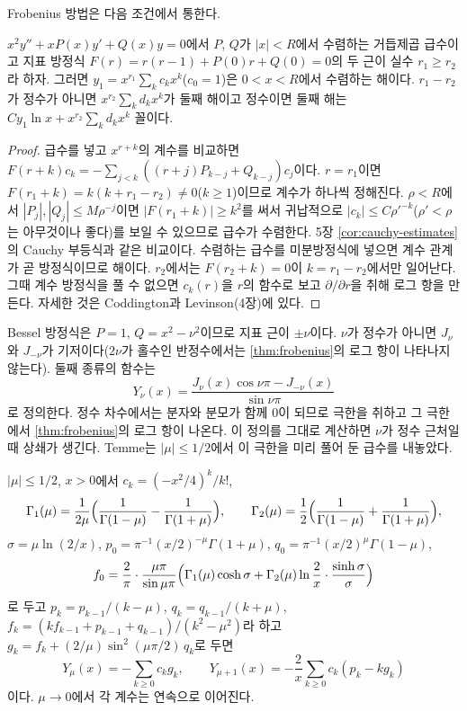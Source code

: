 Frobenius 방법은 다음 조건에서 통한다.

\begin{theorem}[Frobenius]
\label{thm:frobenius}
$x^2y''+xP(x)y'+Q(x)y=0$에서 $P$, $Q$가 $|x|<R$에서 수렴하는 거듭제곱 급수이고 지표 방정식 $F(r)=r(r-1)+P(0)r+Q(0)=0$의 두 근이 실수 $r_1\ge r_2$라 하자. 그러면 $y_1=x^{r_1}\sum_kc_kx^k$($c_0=1$)은 $0<x<R$에서 수렴하는 해이다. $r_1-r_2$가 정수가 아니면 $x^{r_2}\sum_kd_kx^k$가 둘째 해이고 정수이면 둘째 해는 $Cy_1\ln x+x^{r_2}\sum_kd_kx^k$ 꼴이다.
\end{theorem}

\begin{proof}
급수를 넣고 $x^{r+k}$의 계수를 비교하면 $F(r+k)c_k=-\sum_{j<k}((r+j)P_{k-j}+Q_{k-j})c_j$이다. $r=r_1$이면 $F(r_1+k)=k(k+r_1-r_2)\ne0$($k\ge1$)이므로 계수가 하나씩 정해진다. $\rho<R$에서 $|P_j|,|Q_j|\le M\rho^{-j}$이면 $|F(r_1+k)|\ge k^2$를 써서 귀납적으로 $|c_k|\le C\rho'^{-k}$($\rho'<\rho$는 아무것이나 좋다)를 보일 수 있으므로 급수가 수렴한다. 5장 \cref{cor:cauchy-estimates}의 Cauchy 부등식과 같은 비교이다. 수렴하는 급수를 미분방정식에 넣으면 계수 관계가 곧 방정식이므로 해이다. $r_2$에서는 $F(r_2+k)=0$이 $k=r_1-r_2$에서만 일어난다. 그때 계수 방정식을 풀 수 없으면 $c_k(r)$을 $r$의 함수로 보고 $\partial/\partial r$을 취해 로그 항을 만든다. 자세한 것은 Coddington과 Levinson\cite{coddington1955}(4장)에 있다.
\end{proof}

Bessel 방정식은 $P=1$, $Q=x^2-\nu^2$이므로 지표 근이 $\pm\nu$이다. $\nu$가 정수가 아니면 $J_\nu$와 $J_{-\nu}$가 기저이다($2\nu$가 홀수인 반정수에서는 \cref{thm:frobenius}의 로그 항이 나타나지 않는다). 둘째 종류의 함수는
\begin{equation}
\label{eq:yv-def}
Y_\nu(x)=\frac{J_\nu(x)\cos\nu\pi-J_{-\nu}(x)}{\sin\nu\pi}
\end{equation}
로 정의한다. 정수 차수에서는 분자와 분모가 함께 $0$이 되므로 극한을 취하고 그 극한에서 \cref{thm:frobenius}의 로그 항이 나온다. 이 정의를 그대로 계산하면 $\nu$가 정수 근처일 때 상쇄가 생긴다. Temme\cite{temme1975bessel}는 $|\mu|\le1/2$에서 이 극한을 미리 풀어 둔 급수를 내놓았다.

\begin{proposition}[Temme의 급수]
\label{prop:temme-series}
$|\mu|\le1/2$, $x>0$에서 $c_k=(-x^2/4)^k/k!$,
\[
\Gamma_1(\mu)=\frac{1}{2\mu}\Bigl(\frac{1}{\Gamma(1-\mu)}-\frac{1}{\Gamma(1+\mu)}\Bigr),\qquad\Gamma_2(\mu)=\frac12\Bigl(\frac{1}{\Gamma(1-\mu)}+\frac{1}{\Gamma(1+\mu)}\Bigr),
\]
$\sigma=\mu\ln(2/x)$, $p_0=\pi^{-1}(x/2)^{-\mu}\Gamma(1+\mu)$, $q_0=\pi^{-1}(x/2)^\mu\Gamma(1-\mu)$,
\[
f_0=\frac2\pi\cdot\frac{\mu\pi}{\sin\mu\pi}\Bigl(\Gamma_1(\mu)\cosh\sigma+\Gamma_2(\mu)\ln\frac2x\cdot\frac{\sinh\sigma}{\sigma}\Bigr)
\]
로 두고 $p_k=p_{k-1}/(k-\mu)$, $q_k=q_{k-1}/(k+\mu)$, $f_k=(kf_{k-1}+p_{k-1}+q_{k-1})/(k^2-\mu^2)$라 하고 $g_k=f_k+(2/\mu)\sin^2(\mu\pi/2)\,q_k$로 두면
\[
Y_\mu(x)=-\sum_{k\ge0}c_kg_k,\qquad Y_{\mu+1}(x)=-\frac2x\sum_{k\ge0}c_k(p_k-kg_k)
\]
이다. $\mu\to0$에서 각 계수는 연속으로 이어진다.
\end{proposition}


